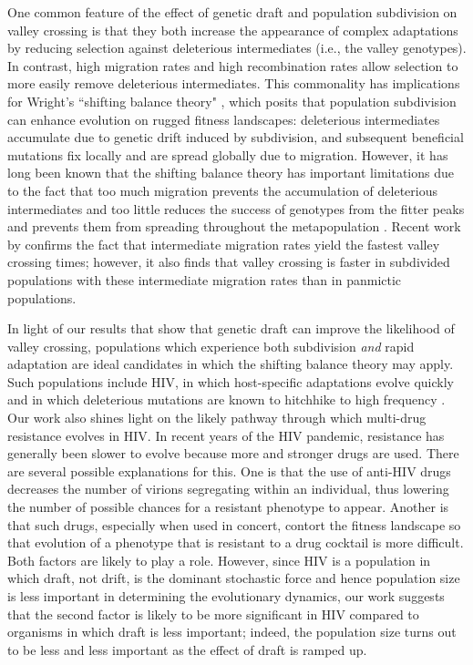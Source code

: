 \documentclass[10pt,twocolumn,twoside]{gsajnl}
\begin{document}
\begin{spacing}{1.5}
One common feature of the effect of genetic draft and population subdivision on valley crossing is that they both increase the appearance of complex adaptations by reducing selection against deleterious intermediates (i.e., the valley genotypes).
In contrast, high migration rates and high recombination rates \citep{neher_shraiman_2009} allow selection to more easily remove deleterious intermediates.
This commonality has implications for Wright's ``shifting balance theory" \citep{Wright:1932}, which posits that population subdivision can enhance evolution on rugged fitness landscapes: deleterious intermediates accumulate due to genetic drift induced by subdivision, and subsequent beneficial mutations fix locally and are spread globally due to migration.
However, it has long been known that the shifting balance theory has important limitations due to the fact that too much migration prevents the accumulation of deleterious intermediates and too little reduces the success of genotypes from the fitter peaks and prevents them from spreading throughout the metapopulation \citep{coyne_barton_turelli_2000,Van-Cleve:Weissman:2015}.
Recent work by \citet{Bitbol:Schwab:2014} confirms the fact that intermediate migration rates yield the fastest valley crossing times; however, it also finds that valley crossing is faster in subdivided populations with these intermediate migration rates than in panmictic populations.

In light of our results that show that genetic draft can improve the likelihood of valley crossing, populations which experience both subdivision \emph{and} rapid adaptation are ideal candidates in which the shifting balance theory may apply.
Such populations include HIV, in which host-specific adaptations evolve quickly \citep{zhang_1997, wain_2007, dapp_2017, theys_2018} and in which deleterious mutations are known to hitchhike to high frequency \citep{zanini_2013, zanini_2015}.
Our work also shines light on the likely pathway through which multi-drug resistance evolves in HIV.
In recent years of the HIV pandemic, resistance has generally been slower to evolve \citep{feder_2015} because more and stronger drugs are used.
There are several possible explanations for this.
One is that the use of anti-HIV drugs decreases the number of virions segregating within an individual, thus lowering the number of possible chances for a resistant phenotype to appear.
Another is that such drugs, especially when used in concert, contort the fitness landscape so that evolution of a phenotype that is resistant to a drug cocktail is more difficult.
Both factors are likely to play a role.
However, since HIV is a population in which draft, not drift, is the dominant stochastic force and hence population size is less important in determining the evolutionary dynamics, our work suggests that the second factor is likely to be more significant in HIV compared to organisms in which draft is less important; indeed, the population size turns out to be less and less important as the effect of draft is ramped up.


\end{spacing}
\end{document}
